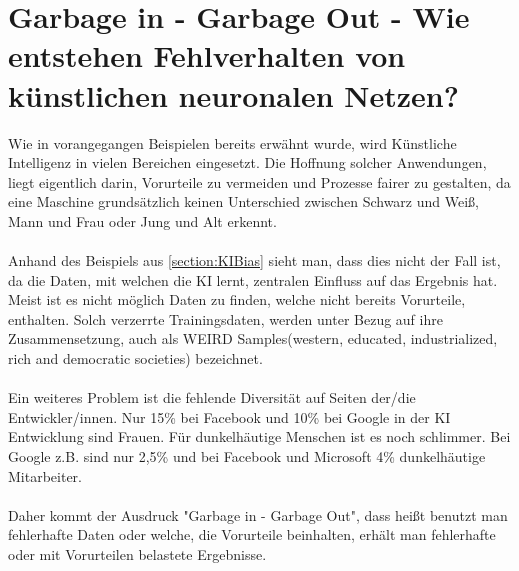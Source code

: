 \documentclass[12pt,oneside,a4paper,parskip]{scrbook}
\begin{document}
\section{Garbage in - Garbage Out - Wie entstehen Fehlverhalten von künstlichen neuronalen Netzen?}
\label{section:oldgarbage}
Wie in vorangegangen Beispielen bereits erwähnt wurde, wird Künstliche Intelligenz in vielen Bereichen eingesetzt. Die Hoffnung solcher Anwendungen, liegt eigentlich darin, Vorurteile zu vermeiden und Prozesse fairer zu gestalten, da eine Maschine grundsätzlich keinen Unterschied zwischen Schwarz und Weiß, Mann und Frau oder Jung und Alt erkennt.
\\\\
Anhand des Beispiels aus \ref{section:KIBias} sieht man, dass dies nicht der Fall ist, da die Daten, mit welchen die KI lernt, zentralen Einfluss auf das Ergebnis hat. Meist ist es nicht möglich Daten zu finden, welche nicht bereits Vorurteile, enthalten. Solch verzerrte Trainingsdaten, werden unter Bezug auf ihre Zusammensetzung, auch als WEIRD Samples(western, educated, industrialized, rich and democratic societies) bezeichnet.%
\\\\
Ein weiteres Problem ist die fehlende Diversität auf Seiten der/die Entwickler/innen. Nur 15\% bei Facebook und 10\% bei Google in der KI Entwicklung sind Frauen. Für dunkelhäutige Menschen ist es noch schlimmer. Bei Google z.B. sind nur 2,5\% und bei Facebook und Microsoft 4\% dunkelhäutige Mitarbeiter\cite{Discriminating}.
\\\\
Daher kommt der Ausdruck "Garbage in - Garbage Out", dass heißt benutzt man fehlerhafte Daten oder welche, die Vorurteile beinhalten, erhält man fehlerhafte oder mit Vorurteilen belastete Ergebnisse.
\end{document}
